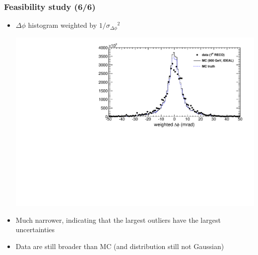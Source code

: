 \documentclass[compress]{beamer}
\begin{document}
\begin{frame}
\frametitle{Feasibility study (6/6)}
\begin{itemize}
\item $\Delta \phi$ histogram weighted by $1/{\sigma_{\Delta \phi}}^2$

\includegraphics[width=\linewidth]{kaonTracking_weighted.pdf}

\item Much narrower, indicating that the largest outliers have the largest uncertainties

\item Data are still broader than MC (and distribution still not Gaussian)
\end{itemize}
\end{frame}
\end{document}
